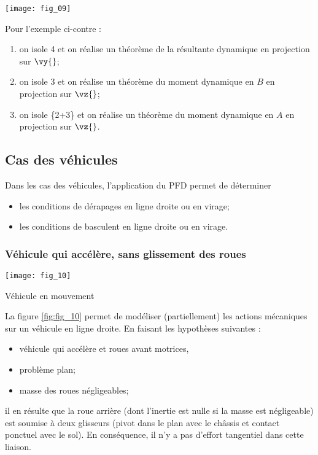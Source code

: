 \begin{marginfigure}
\texttt{[image: fig\_09]}
\end{marginfigure}

Pour l'exemple ci-contre : 
\begin{enumerate}
\item on isole 4 et on réalise un théorème de la résultante dynamique en projection sur $\vy{}$;
\item on isole 3 et on réalise un théorème du moment dynamique en $B$ en projection sur $\vz{}$;
\item on isole \{2+3\} et on réalise un théorème du moment dynamique en $A$ en projection sur $\vz{}$.
\end{enumerate}



\subsection{Cas des véhicules}
Dans les cas des véhicules, l'application du PFD permet de déterminer 
\begin{itemize}
\item les conditions de dérapages en ligne droite ou en virage;
\item les conditions de basculent en ligne droite ou en virage.
\end{itemize}

\subsubsection{Véhicule qui accélère, sans glissement des roues}

\begin{marginfigure}
\texttt{[image: fig\_10]}
\caption{Véhicule en mouvement \label{fig:fig_10}}
\end{marginfigure}

La figure \ref{fig:fig_10} permet de modéliser (partiellement) les actions mécaniques sur un véhicule en ligne droite.  En faisant les hypothèses suivantes : 
\begin{itemize}
\item véhicule qui accélère et roues avant motrices, 
\item problème plan;
\item masse des roues négligeables;
\end{itemize}
il en résulte que la roue arrière (dont l'inertie est nulle si la masse est négligeable) est soumise à deux glisseurs (pivot dans le plan avec le châssis et contact ponctuel avec le sol). En conséquence, il n'y a pas d'effort tangentiel dans cette liaison. 

